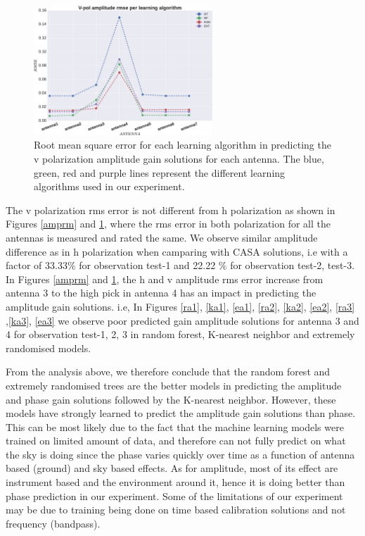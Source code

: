 \begin{figure}[H]
  \centering
    \includegraphics[width=0.6\textwidth]{images/Vpol-amp.eps}
    \caption{Root mean square error for each learning algorithm in predicting the v polarization amplitude gain solutions for each antenna. The blue, green, red and purple lines represent the different learning algorithms used in our experiment.}
  \label{amprmv}
 \end{figure} 

The v polarization rms error is not different from h polarization as shown in Figures \ref{amprm} and \ref{amprmv}, where the rms error in both polarization for all the antennas is measured and rated the same. We observe similar amplitude  difference as in h polarization when camparing with CASA solutions, i.e with a factor of 33.33$\%$ for observation test-1 and 22.22 $\%$ for observation test-2, test-3. In Figures \ref{amprm} and \ref{amprmv}, the h and v amplitude rms error increase from antenna 3 to the high pick in antenna 4 has an impact in predicting the amplitude gain solutions. i.e, In Figures \ref{ra1}, \ref{ka1}, \ref{ea1}, \ref{ra2}, \ref{ka2}, \ref{ea2}, \ref{ra3} ,\ref{ka3}, \ref{ea3} we observe poor predicted gain amplitude solutions for antenna 3 and 4 for observation test-1, 2, 3 in random forest, K-nearest neighbor and extremely randomised models.

From the analysis above, we therefore conclude that the random forest and extremely randomised trees are the better models in predicting the amplitude and phase gain solutions followed by the K-nearest neighbor. However, these models have strongly learned to predict the amplitude gain solutions than phase. This can be most likely due to the fact that the machine learning models were trained on limited amount of data, and therefore can not fully predict on what the sky is doing since the phase varies quickly over time as a function of antenna based (ground) and sky based effects.  As for amplitude, most of its effect are instrument based and the environment around it, hence it is doing better than phase prediction in our experiment. Some of the limitations of our experiment may be due to training being done on time based calibration solutions and not frequency (bandpass). 

